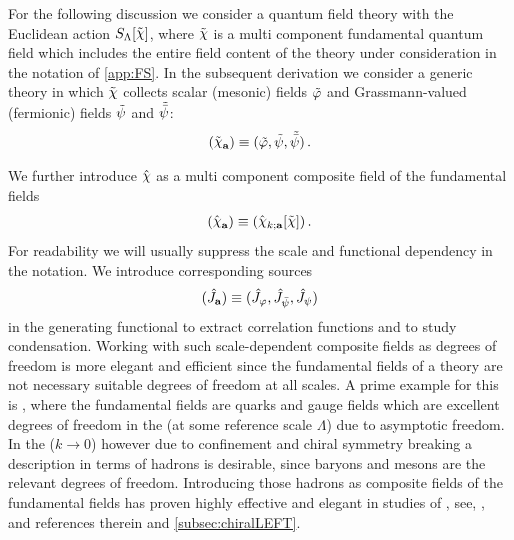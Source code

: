 For the following discussion we consider a quantum field theory with the Euclidean action $\Sinit[\FSff{\FSsf}]$, where $\FSff{\FSsf}$ is a multi component fundamental quantum field which includes the entire field content of the theory under consideration in the \fs{} notation of \cref{app:FS}.
In the subsequent derivation we consider a generic theory in which $\FSff{\FSsf}$ collects scalar (mesonic) fields $\tilde{\varphi}$ and Grassmann-valued (fermionic) fields $\tilde{\psi}$ and $\tilde{\bar{\psi}}$:
\begin{align}
	(\FSffd{\FSsf}{a})\equiv (\FSff{\MFphi},\FSff{\MFpsi},\FSff{\MFpsib})\,.
\end{align}

We further introduce $\FSf{\FSsf}$ as a \rgscaledependent{} multi component composite field of the fundamental fields
\begin{align}
	(\FSfd{\FSsf}{a})\equiv (\FSf{\FSsf}_{k;\FSidx{a}}[\FSff{\FSsf}])\,.
\end{align}
For readability we will usually suppress the scale and functional dependency in the notation.
We introduce corresponding sources
\begin{align}
	(\hat{J}_{\textbf{a}})\equiv (\hat{J}_{\varphi},\hat{J}_{\bar{\psi}}, \hat{J}_{\psi})
\end{align}
in the generating functional to extract correlation functions and to study condensation.
Working with such scale-dependent composite fields as degrees of freedom is more elegant and efficient since the fundamental fields of a theory are not necessary suitable degrees of freedom at all scales.
A prime example for this is \qcd{}, where the fundamental fields are quarks and gauge fields which are excellent degrees of freedom in the \uv{} (at some \uv{} reference scale $\Lambda$) due to asymptotic freedom.
In the \ir{} ($k\rightarrow0$) however \dash{} due to confinement and chiral symmetry breaking \dash{} a description in terms of hadrons is desirable, since baryons and mesons are the relevant degrees of freedom.
Introducing those hadrons as composite fields of the fundamental fields has proven highly effective and elegant in \frg{} studies of \qcd{}, see, \eg{},  and references therein and \cref{subsec:chiralLEFT}.

